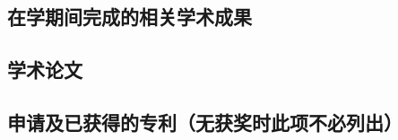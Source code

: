 \begin{resume}


  \section*{在学期间完成的相关学术成果}


  \subsection*{学术论文}

  \begin{achievements}
    \item 
  \end{achievements}

  \subsection*{申请及已获得的专利（无获奖时此项不必列出）}


\end{resume}
